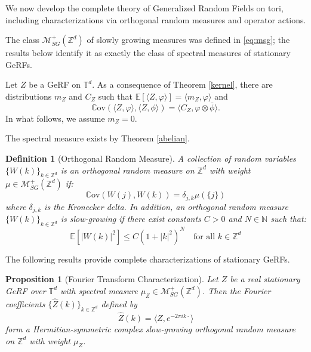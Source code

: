 \documentclass[pdflatex,sn-mathphys,Numbered]{sn-jnl}
\theoremstyle{thmstyleone}%
\newtheorem{proposition}[theorem]{Proposition}%
\theoremstyle{thmstyletwo}%
\theoremstyle{thmstylethree}%
\newtheorem{definition}[theorem]{Definition}%
\newcommand{\ZZ}{\mathbb{Z}}
\newcommand{\NN}{\mathbb{N}}
\newcommand{\TT}{\mathbb{T}}
\newcommand{\calM}{\mathcal{M}}
\newcommand{\Cov}{\mathbb{C}\mathrm{ov}}
\newcommand{\E}{\mathbb{E}}
\begin{document}
\begin{appendices}
We now develop the complete theory of Generalized Random Fields on tori, including characterizations via orthogonal random measures and operator actions.

The class $\calM_{SG}^+(\ZZ^d)$ of slowly growing measures was defined in
\eqref{eq:msg}; the results below identify it as exactly the class of spectral
measures of stationary GeRFs.

Let $Z$ be a GeRF on $\TT^d$.
As a consequence of Theorem \ref{kernel},
there are distributions $m_Z$ and $C_Z$ such that
$\mathbb{E}[\langle Z, \varphi \rangle] = \langle m_Z, \varphi \rangle$ and
$$\Cov(\langle Z, \varphi \rangle, \langle Z, \phi \rangle) = \langle C_Z, \varphi \otimes \bar \phi \rangle .$$
In what follows, we assume $m_Z = 0$.

The spectral measure exists by Theorem \ref{abelian}.

\begin{definition}[Orthogonal Random Measure]
A collection of random variables $\{W(k)\}_{k \in \ZZ^d}$ is an orthogonal random measure
on $\ZZ^d$ with weight $\mu \in \calM_{SG}^+(\ZZ^d)$ if:
$$\Cov(W(j), W(k)) = \delta_{j,k} \mu(\{j\})$$
where $\delta_{j,k}$ is the Kronecker delta.
In addition, an orthogonal random measure $\{W(k)\}_{k \in \ZZ^d}$ is slow-growing
if there exist constants $C > 0$ and $N \in \NN$ such that:
$$\E[|W(k)|^2] \leq C(1 + |k|^2)^N \quad \text{for all } k \in \ZZ^d$$
\end{definition}

The following results provide complete characterizations of stationary GeRFs.

\begin{proposition}[Fourier Transform Characterization]\label{prop:main-torus}
Let $Z$ be a real stationary GeRF over $\TT^d$ with spectral measure $\mu_Z \in \calM_{SG}^+(\ZZ^d)$. Then the Fourier coefficients $\{\hat{Z}(k)\}_{k \in \ZZ^d}$ defined by
$$\hat{Z}(k) = \langle Z, e^{-2\pi i k \cdot} \rangle$$
form a Hermitian-symmetric complex slow-growing orthogonal random measure on $\ZZ^d$ with weight $\mu_Z$.
\end{proposition}


\end{appendices}
\end{document}
